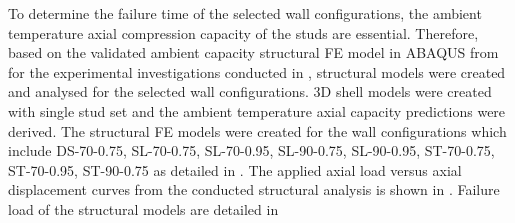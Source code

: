 To determine the failure time of the selected wall configurations, the ambient temperature axial compression capacity of the studs are essential. Therefore, based on the validated ambient capacity structural FE model in ABAQUS from  for the experimental investigations conducted in , structural models were created and analysed for the selected wall configurations. 3D shell models were created with single stud set and the ambient temperature axial capacity predictions were derived. The structural FE models were created for the wall configurations which include DS-70-0.75, SL-70-0.75, SL-70-0.95, SL-90-0.75, SL-90-0.95, ST-70-0.75, ST-70-0.95, ST-90-0.75 as detailed in . The applied axial load versus axial displacement curves from the conducted structural analysis is shown in . Failure load of the structural models are detailed in 
